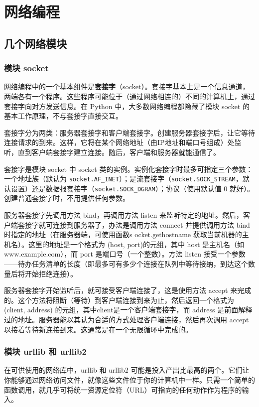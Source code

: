 \chapter{网络编程\label{ch14}}
\section{几个网络模块}
\subsection{模块 socket}
网络编程中的一个基本组件是\textbf{套接字}（socket）。套接字基本上是一个信息通道，两端各有一个程序。这些程序可能位于（通过网络相连的）不同的计算机上，通过套接字向对方发送信息。在 Python 中，大多数网络编程都隐藏了模块 socket 的基本工作原理，不与套接字直接交互。

套接字分为两类：服务器套接字和客户端套接字。创建服务器套接字后，让它等待连接请求的到来。这样，它将在某个网络地址（由IP地址和端口号组成）处监听，直到客户端套接字建立连接。随后，客户端和服务器就能通信了。

套接字是模块 socket 中 socket 类的实例。实例化套接字时最多可指定三个参数：一个地址族（默认为 \verb|socket.AF_INET|）；是流套接字（\verb|socket.SOCK_STREAM|，默认设置）还是数据报套接字（\verb|socket.SOCK_DGRAM|）；协议（使用默认值 0 就好）。创建普通套接字时，不用提供任何参数。

服务器套接字先调用方法 bind，再调用方法 listen 来监听特定的地址。然后，客户端套接字就可连接到服务器了，办法是调用方法 connect 并提供调用方法 bind 时指定的地址（在服务器端，可使用函数s ocket.gethostname 获取当前机器的主机名）。这里的地址是一个格式为 (host, port)的元组，其中 host 是主机名（如www.example.com），而 port 是端口号（一个整数）。方法 listen 接受一个参数——待办任务清单的长度（即最多可有多少个连接在队列中等待接纳，到达这个数量后将开始拒绝连接）。

服务器套接字开始监听后，就可接受客户端连接了，这是使用方法 accept 来完成的。这个方法将阻断（等待）到客户端连接到来为止，然后返回一个格式为 (client, address) 的元组，其中client是一个客户端套接字，而 address 是前面解释过的地址。服务器能以其认为合适的方式处理客户端连接，然后再次调用 accept 以接着等待新连接到来。这通常是在一个无限循环中完成的。
\subsection{模块 urllib 和 urllib2}
在可供使用的网络库中，urllib 和 urllib2 可能是投入产出比最高的两个。它们让你能够通过网络访问文件，就像这些文件位于你的计算机中一样。只需一个简单的函数调用，就几乎可将统一资源定位符（URL）可指向的任何动作作为程序的输入。
